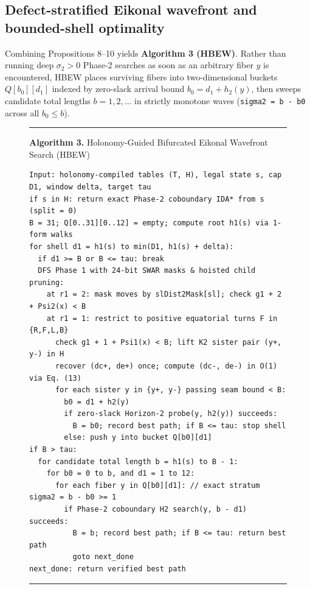 \documentclass[10pt,twocolumn,letterpaper]{article}
\begin{document}
\hypertarget{defect-stratified-eikonal-wavefront-and-bounded-shell-optimality}{%
\subsection{Defect-stratified Eikonal wavefront and bounded-shell optimality}\label{defect-stratified-eikonal-wavefront-and-bounded-shell-optimality}}

Combining Propositions 8--10 yields \textbf{Algorithm 3 (HBEW)}. Rather
than running deep \(\sigma_2 > 0\) Phase-2 searches as soon as an
arbitrary fiber \(y\) is encountered, HBEW places surviving fibers into
two-dimensional buckets \(Q[b_0][d_1]\) indexed by zero-slack arrival
bound \(b_0 = d_1 + h_2(y)\), then sweeps candidate total lengths
\(b = 1, 2, \dots\) in strictly monotone waves
(\texttt{sigma2\ =\ b\ -\ b0} across all \(b_0 \le b\)).

\begin{figure}[t]
\hrule\vspace{5pt}
\textbf{Algorithm 3.} Holonomy-Guided Bifurcated Eikonal Wavefront Search (HBEW)
\vspace{4pt}
\begin{Verbatim}[fontsize=\footnotesize,breaklines=true,breakanywhere=true]
Input: holonomy-compiled tables (T, H), legal state s, cap D1, window delta, target tau
if s in H: return exact Phase-2 coboundary IDA* from s (split = 0)
B = 31; Q[0..31][0..12] = empty; compute root h1(s) via 1-form walks
for shell d1 = h1(s) to min(D1, h1(s) + delta):
  if d1 >= B or B <= tau: break
  DFS Phase 1 with 24-bit SWAR masks & hoisted child pruning:
    at r1 = 2: mask moves by slDist2Mask[sl]; check g1 + 2 + Psi2(x) < B
    at r1 = 1: restrict to positive equatorial turns F in {R,F,L,B}
      check g1 + 1 + Psi1(x) < B; lift K2 sister pair (y+, y-) in H
      recover (dc+, de+) once; compute (dc-, de-) in O(1) via Eq. (13)
      for each sister y in {y+, y-} passing seam bound < B:
        b0 = d1 + h2(y)
        if zero-slack Horizon-2 probe(y, h2(y)) succeeds:
          B = b0; record best path; if B <= tau: stop shell
        else: push y into bucket Q[b0][d1]
if B > tau:
  for candidate total length b = h1(s) to B - 1:
    for b0 = 0 to b, and d1 = 1 to 12:
      for each fiber y in Q[b0][d1]: // exact stratum sigma2 = b - b0 >= 1
        if Phase-2 coboundary H2 search(y, b - d1) succeeds:
          B = b; record best path; if B <= tau: return best path
          goto next_done
next_done: return verified best path
\end{Verbatim}
\vspace{3pt}\hrule
\end{figure}
\end{document}
